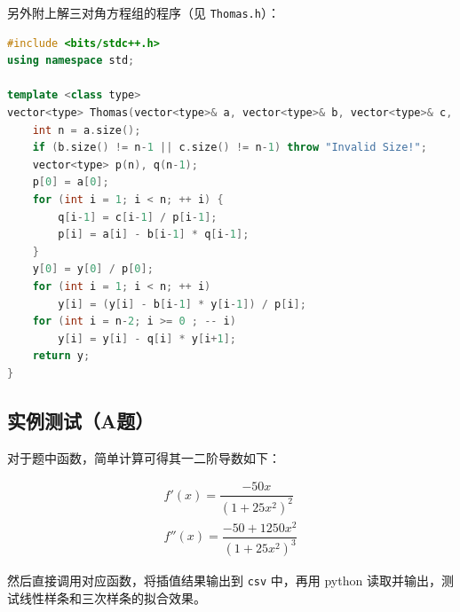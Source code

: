 \documentclass{ctexart}
\begin{document}
另外附上解三对角方程组的程序（见 \verb|Thomas.h|）：

\begin{lstlisting}[language={c++}]
#include <bits/stdc++.h>
using namespace std;

template <class type>
vector<type> Thomas(vector<type>& a, vector<type>& b, vector<type>& c, vector<type> y) {
	int n = a.size();
	if (b.size() != n-1 || c.size() != n-1) throw "Invalid Size!";
	vector<type> p(n), q(n-1);
	p[0] = a[0];
	for (int i = 1; i < n; ++ i) {
		q[i-1] = c[i-1] / p[i-1];
		p[i] = a[i] - b[i-1] * q[i-1];
	}
	y[0] = y[0] / p[0];
	for (int i = 1; i < n; ++ i)
		y[i] = (y[i] - b[i-1] * y[i-1]) / p[i];
	for (int i = n-2; i >= 0 ; -- i)
		y[i] = y[i] - q[i] * y[i+1];
	return y;
}
\end{lstlisting}

\subsection{实例测试（A题）}

对于题中函数，简单计算可得其一二阶导数如下：

\begin{gather}
f'(x)=\dfrac {-50x}{(1+25x^2)^2} \\
f''(x)=\dfrac {-50+1250x^2}{(1+25x^2)^3}
\end{gather}

然后直接调用对应函数，将插值结果输出到 \verb|csv| 中，再用 python 读取并输出，测试线性样条和三次样条的拟合效果。
\end{document}
